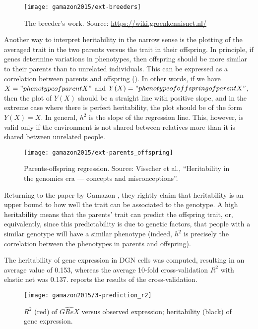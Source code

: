 \documentclass[../main.tex]{subfiles}
\begin{document}
\begin{figure}
	\texttt{[image: gamazon2015/ext-breeders]}
	\caption{The breeder's work. Source: 
\url{https://wiki.groenkennisnet.nl/}}
\end{figure}

Another way to interpret heritability in the narrow sense is the 
plotting of the averaged trait in the two parents versus the trait in 
their offspring. In principle, if genes determine variations in 
phenotypes, then offspring should be more similar to their parents than 
to unrelated individuals. This can be expressed as a correlation between 
parents and offspring (). In other words, if 
we have $X = "phenotype of parent X"$ and $Y(X) = "phenotype of 
offspring of parent X"$, then the plot of $Y(X)$ should be a straight 
line with positive slope, and in the extreme case where there is perfect 
heritability, the plot should be of the form $Y(X) = X$. In general, 
$h^2$ is the slope of the regression line. This, however, is valid only 
if the environment is not shared between relatives more than it is 
shared between unrelated people.

\begin{figure}
	\texttt{[image: gamazon2015/ext-parents\_offspring]}
	\caption{Parents-offspring regression. Source: Visscher et al., 
		\enquote{Heritability in the genomics era — concepts and 
			misconceptions}.}
\end{figure}

Returning to the paper by Gamazon \etal, they rightly claim that 
heritability is an upper bound to how well the trait can be associated 
to the genotype. A high heritability means that the parents' trait can 
predict the offspring trait, or, equivalently, since this predictability 
is due to genetic factors, that people with a similar genotype will have 
a similar phenotype (indeed, $h^2$ is precisely the correlation between 
the phenotypes in parents and offspring).

The heritability of gene expression in DGN cells was computed, resulting 
in an average value of 0.153, whereas the average 10-fold 
cross-validation $R^2$ with elastic net was 0.137. 
 reports the results of the cross-validation.

\begin{figure}
	\texttt{[image: gamazon2015/3-prediction\_r2]}
	\caption{$R^2$ (red) of $\widehat{GReX}$ versus observed expression; 
heritability (black) of gene expression.}
\end{figure}
\end{document}
